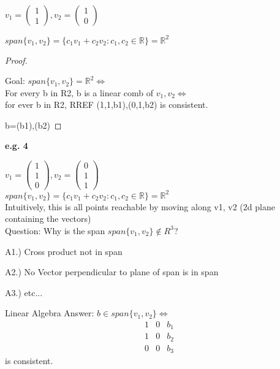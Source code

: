 \documentclass[11pt, notitlepage]{report}
\newcommand{\R}{\mathbb{R}}
\begin{document}
  	  	$v_1 = \left(\begin{matrix}{}
				  1 \\
				  1\end{matrix}\right), v_2 = \left(\begin{matrix}{}
				  1 \\
				  0\end{matrix}\right)$


  	$span\{v_1, v_2\} = \{c_1v_1 + c_2v_2 : c_1,c_2 \in \R\} =\R^2$

\begin{proof} \

	Goal: $span\{v_1, v_2\}=\R^2 \iff$ \\ 
	For every b in R2, b is a linear comb of $v_1, v_2 \iff$ \\
	for ever b in R2, RREF (1,1,b1),(0,1,b2) is consistent.
	
	b=(b1),(b2)
\end{proof}

\textbf{e.g. 4}

  	  	$v_1 = \left(\begin{matrix}{}
				  1 \\
				  1 \\
				  0 
				  \end{matrix}\right), 
				  v_2 = \left(\begin{matrix}{}
				  0 \\
				  1 \\
				  1
				  \end{matrix}\right)$ \\
				  
  	$span\{v_1, v_2\} = \{c_1v_1 + c_2v_2 : c_1,c_2 \in \R\} =\R^2$\\
  	Intuitively, this is all points reachable by moving along v1, v2 (2d plane containing the vectors) \\
  	
  	Question: Why is the span $span\{v_1, v_2\} \notin R^3$?
  	
  	A1.) Cross product not in span
  	
  	A2.) No Vector perpendicular to plane of span is in span
  	
  	A3.) etc...
  	
  	Linear Algebra Answer: $b\in span\{v_1, v_2\} \iff$ \[
\begin{matrix}{}
  1&0 &b_1 \\
  1&0 &b_2 \\
  0&0 &b_3
\end{matrix}
\] is consistent.
\end{document}
